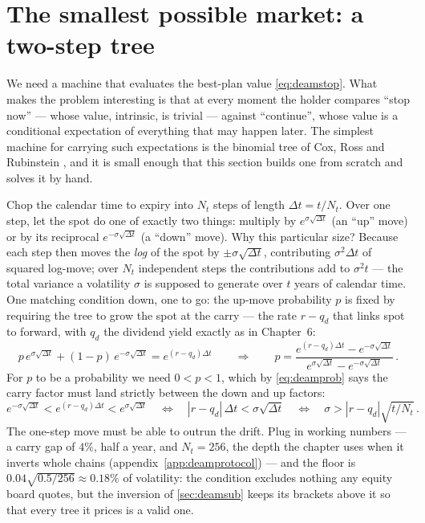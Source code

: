 \section{The smallest possible market: a two-step tree}
\label{sec:deamtree}

We need a machine that evaluates the best-plan value
\eqref{eq:deamstop}.  What makes the problem interesting is that at
every moment the holder compares ``stop now'' --- whose value,
intrinsic, is trivial --- against ``continue'', whose value is a
conditional expectation of everything that may happen later.  The
simplest machine for carrying such expectations is the binomial
tree of Cox, Ross and Rubinstein \citep{CoxRossRubinstein1979}, and it
is small enough that this section builds one from scratch and solves
it by hand.

Chop the calendar time to expiry into $N_t$ steps of length $\Delta
t=t/N_t$.  Over one step, let the spot do one of exactly two things:
multiply by $e^{\sigma\sqrt{\Delta t}}$ (an ``up'' move) or by its
reciprocal $e^{-\sigma\sqrt{\Delta t}}$ (a ``down'' move).  Why this
particular size?  Because each step then moves the \emph{log} of the
spot by $\pm\sigma\sqrt{\Delta t}$, contributing $\sigma^2\Delta t$ of
squared log-move; over $N_t$ independent steps the contributions add
to $\sigma^2 t$ --- the total variance a volatility $\sigma$ is
supposed to generate over $t$ years of calendar time.  One matching
condition down, one to go: the up-move probability $p$ is fixed by
requiring the tree to grow the spot at the carry --- the rate $r-q_d$
that links spot to forward, with $q_d$ the dividend yield exactly as
in Chapter~6:
\begin{equation}
p\,e^{\sigma\sqrt{\Delta t}}+(1-p)\,e^{-\sigma\sqrt{\Delta t}}
=e^{(r-q_d)\Delta t}
\qquad\Longrightarrow\qquad
p=\frac{e^{(r-q_d)\Delta t}-e^{-\sigma\sqrt{\Delta t}}}
       {e^{\sigma\sqrt{\Delta t}}-e^{-\sigma\sqrt{\Delta t}}}\,.
\label{eq:deamprob}
\end{equation}
For $p$ to be a probability we need $0<p<1$, which by
\eqref{eq:deamprob} says the carry factor must land strictly between
the down and up factors:
\[
e^{-\sigma\sqrt{\Delta t}}<e^{(r-q_d)\Delta t}<e^{\sigma\sqrt{\Delta t}}
\quad\Longleftrightarrow\quad
|r-q_d|\,\Delta t<\sigma\sqrt{\Delta t}
\quad\Longleftrightarrow\quad
\sigma>|r-q_d|\sqrt{t/N_t}\,.
\]
The one-step move must be able to outrun the drift.  Plug in working
numbers --- a carry gap of $4\%$, half a year, and $N_t=256$, the
depth the chapter uses when it inverts whole chains
(appendix~\ref{app:deamprotocol}) --- and the floor is
$0.04\sqrt{0.5/256}\approx0.18\%$ of volatility: the condition
excludes nothing any equity board quotes, but the inversion of
\cref{sec:deamsub} keeps its brackets above it so that every tree it
prices is a valid one.

